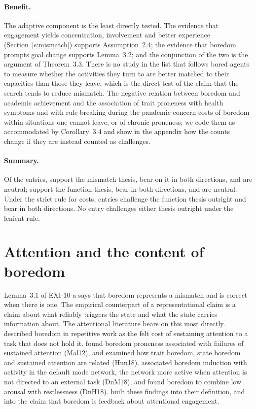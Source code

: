\documentclass{situationist-preprint}
\begin{document}
\paragraph{Benefit.} The adaptive component is the least directly tested. The evidence that engagement yields concentration, involvement and better experience (Section~\ref{s:mismatch}) supports Assumption~2.4; the evidence that boredom prompts goal change supports Lemma~3.2; and the conjunction of the two is the argument of Theorem~3.3. There is no study in the list that follows bored agents to measure whether the activities they turn to are better matched to their capacities than those they leave, which is the direct test of the claim that the search tends to reduce mismatch. The negative relation between boredom and academic achievement \citep{Pekrun2010,Tze2016} and the association of trait proneness with health symptoms \citep{SommersVodanovich2000} and with rule-breaking during the pandemic \citep{Wolff2020,Boylan2021} concern costs of boredom within situations one cannot leave, or of chronic proneness; we code them as accommodated by Corollary~3.4 and show in the appendix how the counts change if they are instead counted as challenges.

\paragraph{Summary.} Of the \stn{} entries, \staS{} support the mismatch thesis, \staSandC{} bear on it in both directions, and \staN{} are neutral; \stbS{} support the function thesis, \stbSandC{} bear in both directions, and \stbN{} are neutral. Under the strict rule for costs, \stbsC{} entries challenge the function thesis outright and \stbsSandC{} bear in both directions. No entry challenges either thesis outright under the lenient rule.


\section{Attention and the content of boredom}\label{s:attention}

Lemma~3.1 of EXI-10-a says that boredom represents a mismatch and is correct when there is one. The empirical counterpart of a representational claim is a claim about what reliably triggers the state and what the state carries information about. The attentional literature bears on this most directly. \citet{OHanlon1981} described boredom in repetitive work as the felt cost of sustaining attention to a task that does not hold it. \citet{Malkovsky2012} found boredom proneness associated with failures of sustained attention (Mal12), and \citet{HunterEastwood2018} examined how trait boredom, state boredom and sustained attention are related (Hun18). \citet{DanckertMerrifield2018} associated boredom induction with activity in the default mode network, the network more active when attention is not directed to an external task (DnM18), and \citet{Danckert2018restless} found boredom to combine low arousal with restlessness (DnH18). \citet{EastwoodEtAl2012} built these findings into their definition, and \citet{Tam2021} into the claim that boredom is feedback about attentional engagement.
\end{document}
